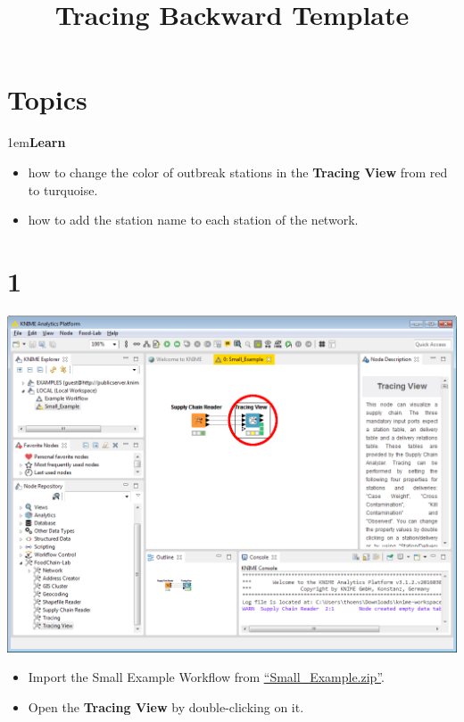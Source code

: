 \documentclass[10pt]{beamer}
\title{Tracing Backward Template}
\date{}
\begin{document}
\maketitle

\section{Topics}
\begin{frame}
\leftskip1em\textbf{Learn}
	\begin{itemize}
		\item how to change the color of outbreak stations in the \textbf{Tracing View} from red to turquoise.
		\item how to add the station name to each station of the network.
	\end{itemize}
\end{frame}

\section{1}
\begin{frame}
	\begin{center}
  		\includegraphics[height=0.6\textheight]{1.png}
	\end{center}
	\begin{itemize}
		\item Import the Small Example Workflow from \textcolor{blue}{\underline{\href{https://github.com/SiLeBAT/BfROpenLabResources/raw/master/GitHubPages/workflows/Small\_Example.zip}{``Small\_Example.zip''}}}.
		\item Open the \textbf{Tracing View} by double-clicking on it.
	\end{itemize}
\end{frame}
\end{document}
